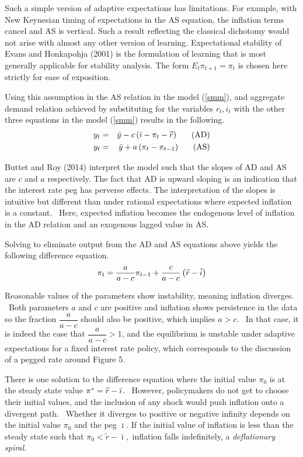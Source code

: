 \documentclass{article}
\begin{document}
\begin{doublespace}
Such a simple version of adaptive expectations has limitations. For example,
with New Keynesian timing of expectations in the AS equation, the inflation
terms cancel and AS is vertical. Such a result reflecting the classical
dichotomy would not arise with almost any other version of learning.
Expectational stability of Evans and Honkapohja (2001) is the formulation of
learning that is most generally applicable for stability analysis. The form $%
E_{t}\pi _{t+1}=\pi _{t}$ is chosen here strictly for ease of exposition.

Using this assumption in the AS relation in the model (\ref{smm}), and
aggregate demand relation achieved by substituting for the variables $%
r_{t},i_{t}$ with the other three equations in the model (\ref{smm}) results
in the following.%
\begin{eqnarray*}
y_{t} &=&\bar{y}-c\left( \bar{\imath}-\pi _{t}-\widetilde{r}\right) \text{ \
\ \ \ (AD)} \\
y_{t} &=&\bar{y}+a\left( \pi _{t}-\pi _{t-1}\right) \text{ \ \ \ \ (AS)}
\end{eqnarray*}

Buttet and Roy (2014) interpret the model such that the slopes of AD and AS
are $c$ and $a$ respectively. The fact that AD is upward sloping is an
indication that the interest rate peg has perverse effects. The
interpretation of the slopes is intuitive but different than under rational
expectations where expected inflation is a constant. \ Here, expected
inflation becomes the endogenous level of inflation in the AD relation and
an exogenous lagged value in AS.

Solving to eliminate output from the AD and AS equations above yields the
following difference equation.%
\begin{equation}
\pi _{t}=\frac{a}{a-c}\pi _{t-1}+\frac{c}{a-c}\left( \widetilde{r}-\overline{%
i}\right)  \label{diff peg}
\end{equation}

Reasonable values of the parameters show instability, meaning inflation
diverges. \ Both parameters $a$ and $c$ are positive and inflation shows
persistence in the data so the fraction $\dfrac{a}{a-c}$ should also be
positive, which implies $a>c$. \ In that case, it is indeed the case that $%
\dfrac{a}{a-c}>1$, and the equilibrium is unstable under adaptive
expectations for a fixed interest rate policy, which corresponds to the
discussion of a pegged rate around Figure 5. \ 

There is one solution to the difference equation where the initial value $%
\pi _{0}$ is at the steady state value $\pi ^{\ast }=\widetilde{r}-\bar{%
\imath}$. \ However, policymakers do not get to choose their initial values,
and the inclusion of any shock would push inflation onto a divergent path. \
Whether it diverges to positive or negative infinity depends on the initial
value $\pi _{0}$ and the peg $\bar{\imath}$. If the initial value of
inflation is less than the steady state such that $\pi _{0}<\widetilde{r}-%
\bar{\imath},$ inflation falls indefinitely, a \textit{deflationary spiral}.


\end{doublespace}
\end{document}
